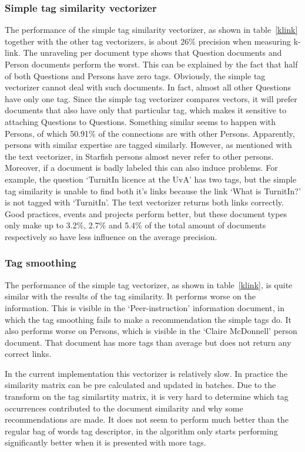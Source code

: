 \subsubsection{Simple tag similarity vectorizer} 
The performance of the simple tag similarity vectorizer, as shown in
table~\ref{klink} together with the other tag vectorizers, is about 26\%
precision when measuring k-link. The unraveling per document type shows that
Question documents and Person documents perform the worst. This can be
explained by the fact that half of both Questions and Persons have zero tags.
Obviously, the simple tag vectorizer cannot deal with such documents. In fact,
almost all other Questions have only one tag. Since the simple tag vectorizer
compares vectors, it will prefer documents that also have only that particular
tag, which makes it sensitive to attaching Questions to Questions. Something
similar seems to happen with Persons, of which 50.91\% of the connections are
with other Persons.  Apparently, persons with similar expertise are tagged
similarly.  However, as mentioned with the text vectorizer, in Starfish persons
almost never refer to other persons.
Moreover, if a document is badly labeled
this can also induce problems. For example, the question `TurnitIn licence at the 
UvA' has two tags, but the simple tag similarity is unable to find both it's links because 
the link `What is TurnitIn?' is not tagged with `TurnitIn'. The text vectorizer returns both
links correctly. Good practices, events and projects perform better, 
but these document types only make up to 3.2\%, 2.7\% and 5.4\% of the
total amount of documents respectively so have less influence on the average
precision.

\subsubsection{Tag smoothing}
The performance of the simple tag vectorizer, as shown in table~\ref{klink}, is
quite similar with the results of the tag similarity. It performs worse on the
information. This is visible in the `Peer-instruction' information document, in which the tag smoothing fails to make a recommendation the simple tags do. It also
performs worse on Persons, which is visible in the `Claire McDonnell' person document. That document has more tags than average but does not return any correct links.

In the current implementation this vectorizer is relatively slow. In practice
the similarity matrix can be pre calculated and updated in batches. Due to the
transform on the tag similartity matrix, it is very hard to determine which tag
occurrences contributed to the document similarity and why some recommendations
are made. It does not seem to perform much better than the regular bag of words
tag descriptor, in \citeauthor{zhou2011web} the algorithm only starts
performing significantly better when it is presented with more tags.

